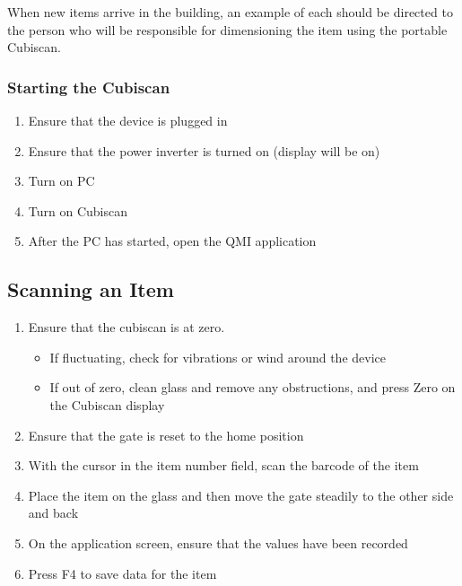
When new items arrive in the building, an example of each should be directed to the person who will be responsible for dimensioning the item using the portable Cubiscan.

\subsubsection{Starting the Cubiscan}

\begin{enumerate}
	\item Ensure that the device is plugged in
	\item Ensure that the power inverter is turned on (display will be on)
	\item Turn on PC
	\item Turn on Cubiscan
	\item After the PC has started, open the QMI application
\end{enumerate}

\subsection{Scanning an Item}

\begin{enumerate}
	\item Ensure that the cubiscan is at zero.
	\begin{itemize}
		\item If fluctuating, check for vibrations or wind around the device
		\item If out of zero, clean glass and remove any obstructions, and press Zero on the Cubiscan display
	\end{itemize}
	\item Ensure that the gate is reset to the home position
	\item With the cursor in the item number field, scan the barcode of the item
	\item Place the item on the glass and then move the gate steadily to the other side and back
	\item On the application screen, ensure that the values have been recorded
	\item Press F4 to save data for the item
\end{enumerate}